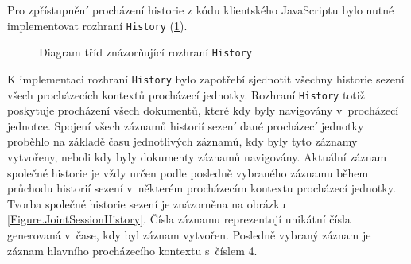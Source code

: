 Pro zpřístupnění procházení historie z kódu klientského JavaScriptu bylo nutné implementovat rozhraní \texttt{History} (\ref{Figure.History}). 

\bigskip

\begin{figure}[H]
  \begin{center}
    \caption{Diagram tříd znázorňující rozhraní \texttt{History}}
    \label{Figure.History}
  \end{center}
\end{figure}

K implementaci rozhraní \texttt{History} bylo zapotřebí sjednotit všechny historie sezení všech procházecích kontextů procházecí jednotky. Rozhraní \texttt{History} totiž poskytuje procházení všech dokumentů, které kdy byly navigovány v~procházecí jednotce. Spojení všech záznamů historií sezení dané procházecí jednotky proběhlo na základě času jednotlivých záznamů, kdy byly tyto záznamy vytvořeny, neboli kdy byly dokumenty záznamů navigovány. Aktuální záznam společné historie je vždy určen podle posledně vybraného záznamu během průchodu historií sezení v~některém procházecím kontextu procházecí jednotky. Tvorba společné historie sezení je znázorněna na obrázku \ref{Figure.JointSessionHistory}. Čísla záznamu reprezentují unikátní čísla generovaná v~čase, kdy byl záznam vytvořen. Posledně vybraný záznam je záznam hlavního procházecího kontextu s~číslem 4.

